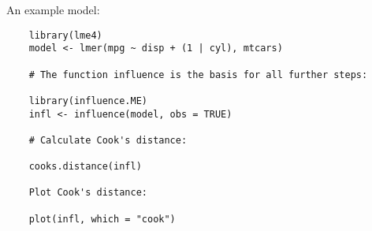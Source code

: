 An example model:

\begin{framed}
	\begin{verbatim}
	library(lme4)
	model <- lmer(mpg ~ disp + (1 | cyl), mtcars)
	
	# The function influence is the basis for all further steps:
	
	library(influence.ME)
	infl <- influence(model, obs = TRUE)
	
	# Calculate Cook's distance:
	
	cooks.distance(infl)
	
	Plot Cook's distance:
	
	plot(infl, which = "cook")
	
	
	\end{verbatim}
\end{framed}

